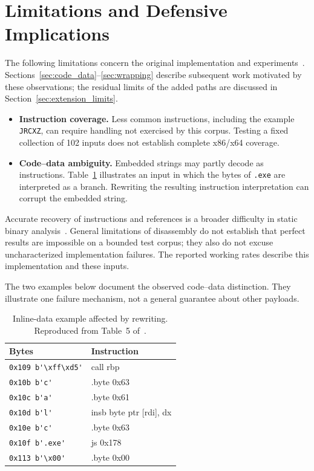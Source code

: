 \documentclass[runningheads]{llncs}
\begin{document}
\section{Limitations and Defensive Implications}\label{sec:limitations}
The following limitations concern the original implementation and experiments~\cite{zone_secrypt_2026}. Sections~\ref{sec:code_data}--\ref{sec:wrapping} describe subsequent work motivated by these observations; the residual limits of the added paths are discussed in Section~\ref{sec:extension_limits}.
\begin{itemize}
    \item \textbf{Instruction coverage.} Less common instructions, including the example \texttt{JRCXZ}, can require handling not exercised by this corpus. Testing a fixed collection of 102 inputs does not establish complete x86/x64 coverage.
    \item \textbf{Code--data ambiguity.} Embedded strings may partly decode as instructions. Table~\ref{tab:broken-payload} illustrates an input in which the bytes of \texttt{.exe} are interpreted as a branch. Rewriting the resulting instruction interpretation can corrupt the embedded string.
\end{itemize}

Accurate recovery of instructions and references is a broader difficulty in static binary analysis~\cite{staticdisasmTuringComplete}. General limitations of disassembly do not establish that perfect results are impossible on a bounded test corpus; they also do not excuse uncharacterized implementation failures. The reported working rates describe this implementation and these inputs.

The two examples below document the observed code--data distinction. They illustrate one failure mechanism, not a general guarantee about other payloads.

\begin{table}[t]
    \caption{Inline-data example affected by rewriting. Reproduced from Table~5 of~\cite{zone_secrypt_2026}.}
    \label{tab:broken-payload}
    \small
    \centering
    \setlength{\tabcolsep}{3pt}
    \begin{tabular}{ll}
        \hline
        \textbf{Bytes}  & \textbf{Instruction} \\ \hline
        \verb|0x109 b'\xff\xd5'|  & call  rbp \\ \hline
        \verb|0x10b b'c'|         & .byte 0x63 \\ \hline
        \verb|0x10c b'a'|         & .byte 0x61 \\ \hline
        \verb|0x10d b'l'|         & insb  byte ptr [rdi], dx \\ \hline
        \verb|0x10e b'c'|         & .byte 0x63 \\ \hline
        \verb|0x10f b'.exe'|      & js    0x178 \\ \hline
        \verb|0x113 b'\x00'|      & .byte 0x00 \\ \hline
    \end{tabular}
\end{table}
\end{document}
